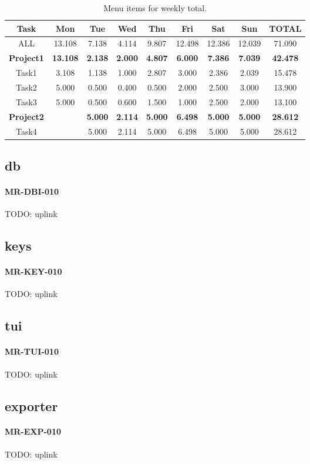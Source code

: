 \begin{table} \caption{\label{tab:weekly_total_menu_items} Menu items for
    weekly total.}
  \begin{tabular}{| c | c | c | c | c | c | c | c | c |} \hline
    Task & Mon & Tue & Wed & Thu & Fri & Sat & Sun & TOTAL \\ \hline
    ALL & 13.108 & 7.138 & 4.114 & 9.807
        & 12.498 & 12.386 & 12.039 & 71.090 \\ \hline
    \textbf{Project1} & \textbf{13.108} & \textbf{2.138} & \textbf{2.000}
                      & \textbf{4.807} & \textbf{6.000} & \textbf{7.386}
                      & \textbf{7.039} & \textbf{42.478} \\ \hline
    Task1 & 3.108 & 1.138 & 1.000
          & 2.807 & 3.000 & 2.386
          & 2.039 & 15.478 \\ \hline
    Task2 & 5.000 & 0.500 & 0.400
          & 0.500 & 2.000 & 2.500
          & 3.000 & 13.900 \\ \hline
    Task3 & 5.000 & 0.500 & 0.600
          & 1.500 & 1.000 & 2.500
          & 2.000 & 13.100 \\ \hline
    \textbf{Project2} & & \textbf{5.000} & \textbf{2.114}
                      & \textbf{5.000} & \textbf{6.498} & \textbf{5.000}
                      & \textbf{5.000} & \textbf{28.612} \\ \hline
    Task4 & & 5.000 & 2.114
          & 5.000 & 6.498 & 5.000
          & 5.000 & 28.612 \\ \hline
  \end{tabular}
\end{table}
\subsection{db}
\paragraph{MR-DBI-010}
TODO: uplink

\subsection{keys}
\paragraph{MR-KEY-010}
TODO: uplink

\subsection{tui}
\paragraph{MR-TUI-010}
TODO: uplink

\subsection{exporter}
\paragraph{MR-EXP-010}
TODO: uplink
